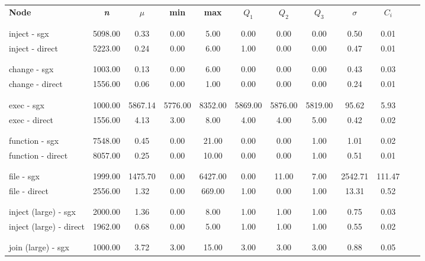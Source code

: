 \begin{tabular}{|l|c|c|c|c|c|c|c|c|c|c|c|}
\hline
\textbf{Node} & \textbf{\textit{n}} & \textbf{$\mu$} & \textbf{min} & \textbf{max} & \textbf{$Q_1$} & \textbf{$Q_2$} & \textbf{$Q_3$} &\textbf{$\sigma$} & \textbf{$C_i$}\\ 
\\ \hline \\ \hline 
inject - sgx & 5098.00 & 0.33 & 0.00 & 5.00 & 0.00 & 0.00 & 0.00 & 0.50 & 0.01\\ 
inject - direct & 5223.00 & 0.24 & 0.00 & 6.00 & 1.00 & 0.00 & 0.00 & 0.47 & 0.01\\ 
\\ \hline \\ \hline 
change - sgx & 1003.00 & 0.13 & 0.00 & 6.00 & 0.00 & 0.00 & 0.00 & 0.43 & 0.03\\ 
change - direct & 1556.00 & 0.06 & 0.00 & 1.00 & 0.00 & 0.00 & 0.00 & 0.24 & 0.01\\ 
\\ \hline \\ \hline 
exec - sgx & 1000.00 & 5867.14 & 5776.00 & 8352.00 & 5869.00 & 5876.00 & 5819.00 & 95.62 & 5.93\\ 
exec - direct & 1556.00 & 4.13 & 3.00 & 8.00 & 4.00 & 4.00 & 5.00 & 0.42 & 0.02\\ 
\\ \hline \\ \hline 
function - sgx & 7548.00 & 0.45 & 0.00 & 21.00 & 0.00 & 0.00 & 1.00 & 1.01 & 0.02\\ 
function - direct & 8057.00 & 0.25 & 0.00 & 10.00 & 0.00 & 0.00 & 1.00 & 0.51 & 0.01\\ 
\\ \hline \\ \hline 
file - sgx & 1999.00 & 1475.70 & 0.00 & 6427.00 & 0.00 & 11.00 & 7.00 & 2542.71 & 111.47\\ 
file - direct & 2556.00 & 1.32 & 0.00 & 669.00 & 1.00 & 0.00 & 1.00 & 13.31 & 0.52\\ 
\\ \hline \\ \hline 
inject (large) - sgx & 2000.00 & 1.36 & 0.00 & 8.00 & 1.00 & 1.00 & 1.00 & 0.75 & 0.03\\ 
inject (large) - direct & 1962.00 & 0.68 & 0.00 & 5.00 & 1.00 & 1.00 & 1.00 & 0.55 & 0.02\\ 
\\ \hline \\ \hline 
join (large) - sgx & 1000.00 & 3.72 & 3.00 & 15.00 & 3.00 & 3.00 & 3.00 & 0.88 & 0.05\\ 

\end{tabular}
